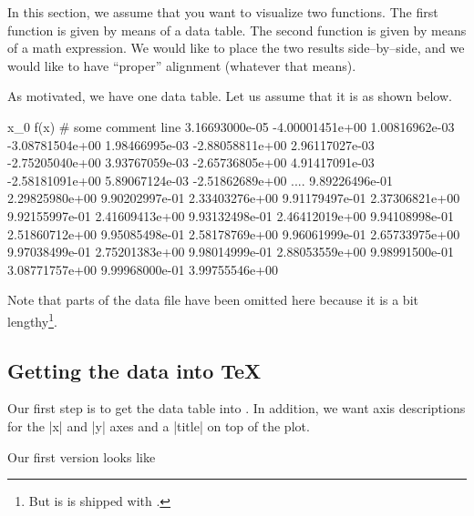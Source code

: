 
In this section, we assume that you want to visualize two functions. The first function is given by means of a data table. The second function is given by means of a math expression. We would like to place the two results side--by--side, and we would like to have ``proper'' alignment (whatever that means).

As motivated, we have one data table. Let us assume that it is as shown below.
\begin{codeexample}
x_0	f(x)
# some comment line
3.16693000e-05	-4.00001451e+00
1.00816962e-03	-3.08781504e+00
1.98466995e-03	-2.88058811e+00
2.96117027e-03	-2.75205040e+00
3.93767059e-03	-2.65736805e+00
4.91417091e-03	-2.58181091e+00
5.89067124e-03	-2.51862689e+00
....
9.89226496e-01	2.29825980e+00
9.90202997e-01	2.33403276e+00
9.91179497e-01	2.37306821e+00
9.92155997e-01	2.41609413e+00
9.93132498e-01	2.46412019e+00
9.94108998e-01	2.51860712e+00
9.95085498e-01	2.58178769e+00
9.96061999e-01	2.65733975e+00
9.97038499e-01	2.75201383e+00
9.98014999e-01	2.88053559e+00
9.98991500e-01	3.08771757e+00
9.99968000e-01	3.99755546e+00
\end{codeexample}
Note that parts of the data file have been omitted here because it is a bit lengthy\footnote{But is is shipped with \PGFPlots.}.

\subsection{Getting the data into \TeX}
\label{sec:tut1:step1}
Our first step is to get the data table into \PGFPlots. In addition, we want axis descriptions for the |x| and |y| axes and a |title| on top of the plot.

Our first version looks like
\begin{codeexample}[]

%

%
\end{codeexample}

